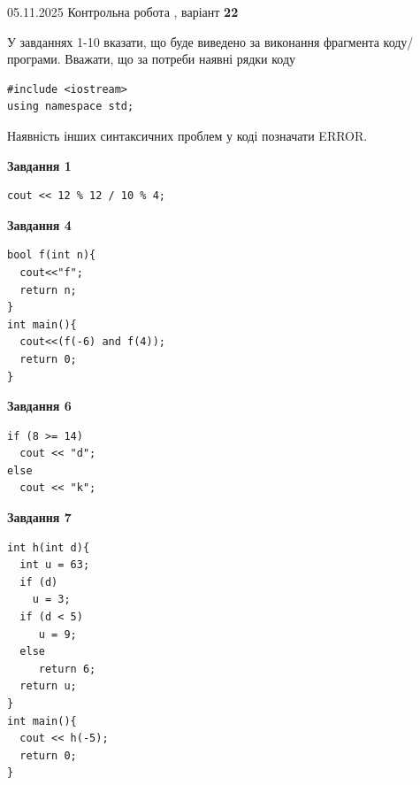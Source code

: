 \documentclass[12pt, ukrainian]{article}
\begin{document}
\newpage

{\Large{05.11.2025 Контрольна робота , варіант  \No \textbf { 22 }\par}}
{
\begin {large}
У завданнях 1-10 вказати, що буде виведено за виконання фрагмента коду/про\-гра\-ми.
Вважати, що за потреби наявні рядки коду
\begin{verbatim}
#include <iostream>
using namespace std;
\end{verbatim}
Наявність інших синтаксичних проблем у коді позначати ERROR.

\begin{minipage}[t]{7.0cm}

\begin{center}
\textbf{Завдання 1}
\end{center}
\vspace{-8mm}

\begin{verbatim}
cout << 12 % 12 / 10 % 4;
\end{verbatim}



\begin{center}
\textbf{Завдання 4}
\end{center}
\vspace{-8mm}

\begin{verbatim}
bool f(int n){
  cout<<"f";
  return n;
}
int main(){
  cout<<(f(-6) and f(4));
  return 0;
}
\end{verbatim}



\begin{center}
\textbf{Завдання 6}
\end{center}
\vspace{-8mm}

\begin{verbatim}
if (8 >= 14)
  cout << "d";
else
  cout << "k";
\end{verbatim}



\begin{center}
\textbf{Завдання 7}
\end{center}
\vspace{-8mm}

\begin{verbatim}
int h(int d){
  int u = 63;
  if (d)
    u = 3;
  if (d < 5)
     u = 9;
  else
     return 6;
  return u;
}
int main(){
  cout << h(-5);
  return 0;
}
\end{verbatim}


\end{minipage}
\end{large}}
\end{document}
